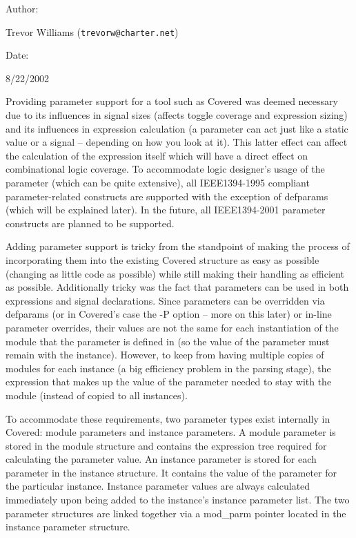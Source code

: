 \begin{Desc}
\item[Author: ]\par
Trevor Williams ({\tt trevorw@charter.net}) \end{Desc}
\begin{Desc}
\item[Date: ]\par
8/22/2002

 Providing parameter support for a tool such as Covered was deemed necessary due to its influences in signal sizes (affects toggle coverage and expression sizing) and its  influences in expression calculation (a parameter can act just like a static value or a signal -- depending on how you look at it). This latter effect can affect the calculation of the expression itself which will have a direct effect on combinational logic coverage. To accommodate logic designer's usage of the parameter (which can be quite extensive), all IEEE1394-1995 compliant parameter-related constructs are supported with the exception of defparams (which will be explained later). In the future, all IEEE1394-2001 parameter constructs are planned to be supported.

 Adding parameter support is tricky from the standpoint of making the process of incorporating them into the existing Covered structure as easy as possible (changing as little code as possible) while still making their handling as efficient as possible. Additionally tricky was the fact that parameters can be used in both expressions and signal declarations. Since parameters can be overridden via defparams (or in Covered's case the -P option -- more on this later) or in-line parameter overrides, their values are not the same for each instantiation of the module that the parameter is defined in (so the value of the parameter must remain with the instance). However, to keep from having multiple copies of modules for each instance (a big efficiency problem in the parsing stage), the expression that makes up the value of the parameter needed to stay with the module (instead of copied to all instances).

 To accommodate these requirements, two parameter types exist internally in Covered: module parameters and instance parameters. A module parameter is stored in the module structure and contains the expression tree required for calculating the parameter value. An instance  parameter is stored for each parameter in the instance structure. It contains the value of the parameter for the particular instance. Instance parameter values are always calculated immediately upon being added to the instance's instance parameter list. The two parameter structures are linked together via a mod\_\-parm pointer located in the instance parameter structure.\end{Desc}


